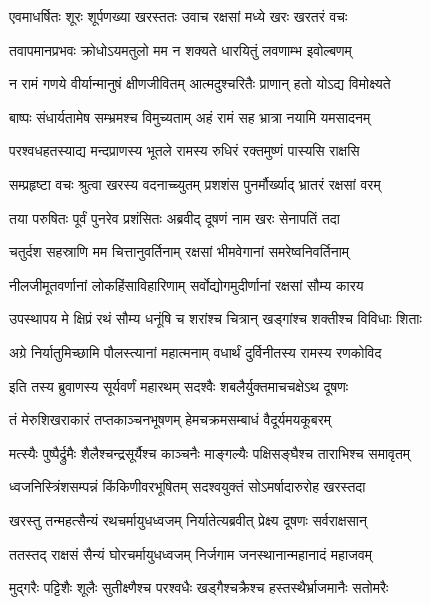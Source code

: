 
\twolineshloka
{एवमाधर्षितः शूरः शूर्पणख्या खरस्ततः}
{उवाच रक्षसां मध्ये खरः खरतरं वचः} %

\twolineshloka
{तवापमानप्रभवः क्रोधोऽयमतुलो मम}
{न शक्यते धारयितुं लवणाम्भ इवोल्बणम्} %

\twolineshloka
{न रामं गणये वीर्यान्मानुषं क्षीणजीवितम्}
{आत्मदुश्चरितैः प्राणान् हतो योऽद्य विमोक्ष्यते} %

\twolineshloka
{बाष्पः संधार्यतामेष सम्भ्रमश्च विमुच्यताम्}
{अहं रामं सह भ्रात्रा नयामि यमसादनम्} %

\twolineshloka
{परश्वधहतस्याद्य मन्दप्राणस्य भूतले}
{रामस्य रुधिरं रक्तमुष्णं पास्यसि राक्षसि} %

\twolineshloka
{सम्प्रहृष्टा वचः श्रुत्वा खरस्य वदनाच्च्युतम्}
{प्रशशंस पुनर्मौर्ख्याद् भ्रातरं रक्षसां वरम्} %

\twolineshloka
{तया परुषितः पूर्वं पुनरेव प्रशंसितः}
{अब्रवीद् दूषणं नाम खरः सेनापतिं तदा} %

\twolineshloka
{चतुर्दश सहस्राणि मम चित्तानुवर्तिनाम्}
{रक्षसां भीमवेगानां समरेष्वनिवर्तिनाम्} %

\twolineshloka
{नीलजीमूतवर्णानां लोकहिंसाविहारिणाम्}
{सर्वोद्योगमुदीर्णानां रक्षसां सौम्य कारय} %

\twolineshloka
{उपस्थापय मे क्षिप्रं रथं सौम्य धनूंषि च}
{शरांश्च चित्रान् खड्गांश्च शक्तीश्च विविधाः शिताः} %

\twolineshloka
{अग्रे निर्यातुमिच्छामि पौलस्त्यानां महात्मनाम्}
{वधार्थं दुर्विनीतस्य रामस्य रणकोविद} %

\twolineshloka
{इति तस्य ब्रुवाणस्य सूर्यवर्णं महारथम्}
{सदश्वैः शबलैर्युक्तमाचचक्षेऽथ दूषणः} %

\twolineshloka
{तं मेरुशिखराकारं तप्तकाञ्चनभूषणम्}
{हेमचक्रमसम्बाधं वैदूर्यमयकूबरम्} %

\twolineshloka
{मत्स्यैः पुष्पैर्द्रुमैः शैलैश्चन्द्रसूर्यैश्च काञ्चनैः}
{माङ्गल्यैः पक्षिसङ्घैश्च ताराभिश्च समावृतम्} %

\twolineshloka
{ध्वजनिस्त्रिंशसम्पन्नं किंकिणीवरभूषितम्}
{सदश्वयुक्तं सोऽमर्षादारुरोह खरस्तदा} %

\twolineshloka
{खरस्तु तन्महत्सैन्यं रथचर्मायुधध्वजम्}
{निर्यातेत्यब्रवीत् प्रेक्ष्य दूषणः सर्वराक्षसान्} %

\twolineshloka
{ततस्तद् राक्षसं सैन्यं घोरचर्मायुधध्वजम्}
{निर्जगाम जनस्थानान्महानादं महाजवम्} %

\twolineshloka
{मुद्गरैः पट्टिशैः शूलैः सुतीक्ष्णैश्च परश्वधैः}
{खड्गैश्चक्रैश्च हस्तस्थैर्भ्राजमानैः सतोमरैः} %

